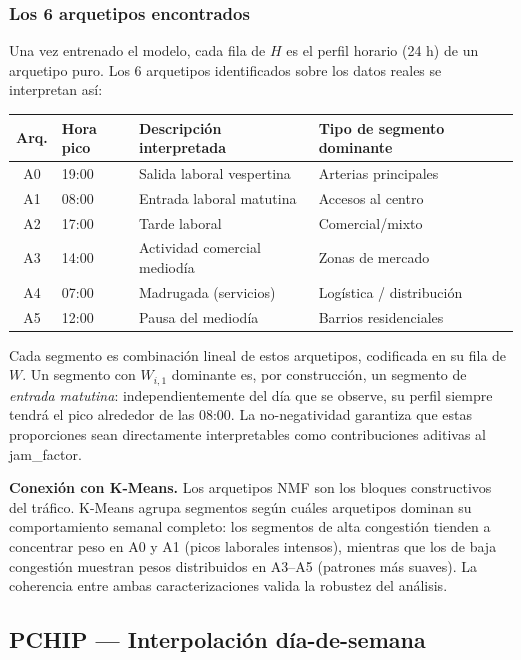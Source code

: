 \documentclass[12pt,a4paper]{article}
\begin{document}
\subsubsection{Los 6 arquetipos encontrados}

Una vez entrenado el modelo, cada fila de $H$ es el perfil horario
(24 h) de un arquetipo puro.
Los 6 arquetipos identificados sobre los datos reales se interpretan así:

\begin{center}
\begin{tabular}{clll}
  \toprule
  Arq. & Hora pico & Descripción interpretada & Tipo de segmento dominante \\
  \midrule
  A0 & 19:00 & Salida laboral vespertina    & Arterias principales \\
  A1 & 08:00 & Entrada laboral matutina     & Accesos al centro \\
  A2 & 17:00 & Tarde laboral                & Comercial/mixto \\
  A3 & 14:00 & Actividad comercial mediodía & Zonas de mercado \\
  A4 & 07:00 & Madrugada (servicios)        & Logística / distribución \\
  A5 & 12:00 & Pausa del mediodía           & Barrios residenciales \\
  \bottomrule
\end{tabular}
\end{center}

Cada segmento es combinación lineal de estos arquetipos, codificada en
su fila de $W$.
Un segmento con $W_{i,1}$ dominante es, por construcción, un segmento de
\emph{entrada matutina}: independientemente del día que se observe, su
perfil siempre tendrá el pico alrededor de las 08:00.
La no-negatividad garantiza que estas proporciones sean directamente
interpretables como contribuciones aditivas al jam\_factor.

\medskip
\textbf{Conexión con K-Means.}
Los arquetipos NMF son los bloques constructivos del tráfico.
K-Means agrupa segmentos según cuáles arquetipos dominan su comportamiento
semanal completo: los segmentos de alta congestión tienden a concentrar
peso en A0 y A1 (picos laborales intensos), mientras que los de baja
congestión muestran pesos distribuidos en A3--A5 (patrones más suaves).
La coherencia entre ambas caracterizaciones valida la robustez del análisis.

\subsection{PCHIP --- Interpolación día-de-semana}
\end{document}
